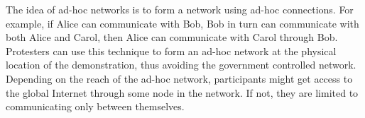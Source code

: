 The idea of ad-hoc networks is to form a network using ad-hoc connections.
For example, if Alice can communicate with Bob, Bob in turn can communicate 
with both Alice and Carol, then Alice can communicate with Carol through Bob.
Protesters can use this technique to form an ad-hoc network at the physical 
location of the demonstration, thus avoiding the government controlled network.
Depending on the reach of the ad-hoc network, participants might get access to 
the global Internet through some node in the network.
If not, they are limited to communicating only between themselves.
